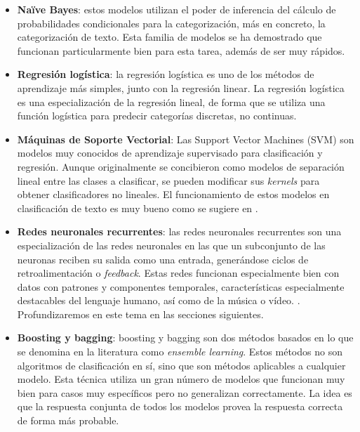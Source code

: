 \begin{itemize}
    
    \item \textbf{Naïve Bayes}: estos modelos utilizan el poder de inferencia del cálculo de probabilidades condicionales para la categorización, más en concreto, la categorización de texto. Esta familia de modelos se ha demostrado que funcionan particularmente bien para esta tarea, además de ser muy rápidos. \cite{FrankNaive2006}
    
    \item \textbf{Regresión logística}: la regresión logística es uno de los métodos de aprendizaje más simples, junto con la regresión linear. La regresión logística es una especialización de la regresión lineal, de forma que se utiliza una función logística para predecir categorías discretas, no continuas. \cite{logitText}
    
    \item \textbf{Máquinas de Soporte Vectorial}: Las Support Vector Machines (SVM) son modelos muy conocidos de aprendizaje supervisado para clasificación y regresión. Aunque originalmente se concibieron como modelos de separación lineal entre las clases a clasificar, se pueden modificar sus \textit{kernels} para obtener clasificadores no lineales. El funcionamiento de estos modelos en clasificación de texto es muy bueno como se sugiere en \cite{SVMJoa1998}.

    \item \textbf{Redes neuronales recurrentes}: las redes neuronales recurrentes son una especialización de las redes neuronales en las que un subconjunto de las neuronas reciben su salida como una entrada, generándose ciclos de retroalimentación o \textit{feedback}. Estas redes funcionan especialmente bien con datos con patrones y componentes temporales, características especialmente destacables del lenguaje humano, así como de la música o vídeo. \cite{ZhouLSTM}. Profundizaremos en este tema en las secciones siguientes.
    
    \item \textbf{Boosting y bagging}: boosting y bagging son dos métodos basados en lo que se denomina en la literatura como \textit{ensemble learning}. Estos métodos no son algoritmos de clasificación en sí, sino que son métodos aplicables a cualquier modelo. Esta técnica utiliza un gran número de modelos que funcionan muy bien para casos muy específicos pero no generalizan correctamente. La idea es que la respuesta conjunta de todos los modelos provea la respuesta correcta de forma más probable. \cite{Bauer2004AnEC}

\end{itemize}


